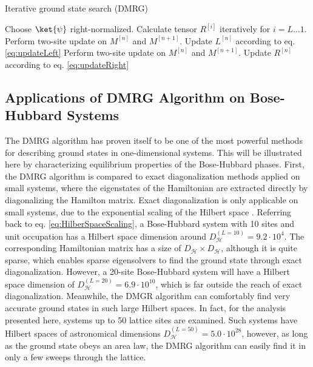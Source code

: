 \begin{algorithm}
\begin{algorithmic}
\caption{Iterative ground state search (DMRG)}
\State Choose $\ket{\psi}$ right-normalized.
\State Calculate tensor $R^{[i]}$ iteratively for $i = L \ldots 1$.
	 
		\State Perform two-site update on $M^{[n]}$ and $M^{[n+1]}$.
		\State Update $L^{[n]}$ according to eq. \eqref{eq:updateLeft}
	\EndFor
	 
		\State Perform two-site update on $M^{[n]}$ and $M^{[n+1]}$.
		\State Update $R^{[n]}$ according to eq. \eqref{eq:updateRight}
	\EndFor
\EndWhile
\end{algorithmic}
\label{alg:DMRG}
\end{algorithm}


\subsection{Applications of DMRG Algorithm on Bose-Hubbard Systems} \label{chap:CondFrac}
The DMRG algorithm has proven itself to be one of the most powerful methods for describing ground states in one-dimensional systems. This will be illustrated here by characterizing equilibrium properties of the Bose-Hubbard phases. First, the DMRG algorithm is compared to exact diagonalization methods applied on small systems, where the eigenstates of the Hamiltonian are extracted directly by diagonalizing the Hamilton matrix. Exact diagonalization is only applicable on small systems, due to the exponential scaling of the Hilbert space \cite{Vidal2003}. Referring back to eq. \eqref{eq:HilberSpaceScaling}, a Bose-Hubbard system with 10 sites and unit occupation has a Hilbert space dimension around $D_{\mathcal{H}}^{(L = 10)} = 9.2 \cdot 10^{4}$. The corresponding Hamiltonian matrix has a size of $D_{\mathcal{H}} \times D_{\mathcal{H}}$, although it is quite sparse, which enables sparse eigensolvers to find the ground state through exact diagonalization.
However, a 20-site Bose-Hubbard system will have a Hilbert space dimension of $D_{\mathcal{H}}^{(L = 20)} = 6.9 \cdot 10^{10}$, which is far outside the reach of exact diagonalization. Meanwhile, the DMGR algorithm can comfortably find very accurate ground states in such large Hilbert spaces. In fact, for the analysis presented here, systems up to 50 lattice sites are examined. Such systems have Hilbert spaces of astronomical dimensions $D_{\mathcal{H}}^{(L = 50)} = 5.0 \cdot 10^{28}$, however, as long as the ground state obeys an area law, the DMRG algorithm can easily find it in only a few sweeps through the lattice.



